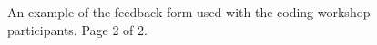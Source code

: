 \documentclass[12pt]{report} %
\begin{document}
\begin{figure}[t!]
  \ContinuedFloat
  \captionsetup{list=off, format=cont}
    \centering
\caption{An example of the feedback form used with the coding workshop participants. Page 2 of 2. } 
\label{fig:QsP2}
\end{figure}
\end{document}
